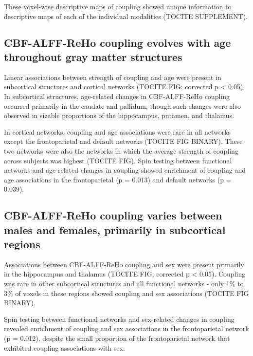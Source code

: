 \documentclass[
  12pt,
]{article}
\begin{document}
These voxel-wise descriptive maps of coupling showed unique information to descriptive maps of each of the individual modalities (TOCITE SUPPLEMENT).

\hypertarget{cbf-alff-reho-coupling-evolves-with-age-throughout-gray-matter-structures}{%
\subsection{CBF-ALFF-ReHo coupling evolves with age throughout gray matter structures}\label{cbf-alff-reho-coupling-evolves-with-age-throughout-gray-matter-structures}}

Linear associations between strength of coupling and age were present in subcortical structures and cortical networks (TOCITE FIG; corrected p \textless{} 0.05). In subcortical structures, age-related changes in CBF-ALFF-ReHo coupling occurred primarily in the caudate and pallidum, though such changes were also observed in sizable proportions of the hippocampus, putamen, and thalamus.

In cortical networks, coupling and age associations were rare in all networks except the frontoparietal and default networks (TOCITE FIG BINARY). These two networks were also the networks in which the average strength of coupling across subjects was highest (TOCITE FIG). Spin testing between functional networks and age-related changes in coupling showed enrichment of coupling and age associations in the frontoparietal (p = 0.013) and default networks (p = 0.039).

\hypertarget{cbf-alff-reho-coupling-varies-between-males-and-females-primarily-in-subcortical-regions}{%
\subsection{CBF-ALFF-ReHo coupling varies between males and females, primarily in subcortical regions}\label{cbf-alff-reho-coupling-varies-between-males-and-females-primarily-in-subcortical-regions}}

Associations between CBF-ALFF-ReHo coupling and sex were present primarily in the hippocampus and thalamus (TOCITE FIG; corrected p \textless{} 0.05). Coupling was rare in other subcortical structures and all functional networks - only 1\% to 3\% of voxels in these regions showed coupling and sex associations (TOCITE FIG BINARY).

Spin testing between functional networks and sex-related changes in coupling revealed enrichment of coupling and sex associations in the frontoparietal network (p = 0.012), despite the small proportion of the frontoparietal network that exhibited coupling associations with sex.
\end{document}
